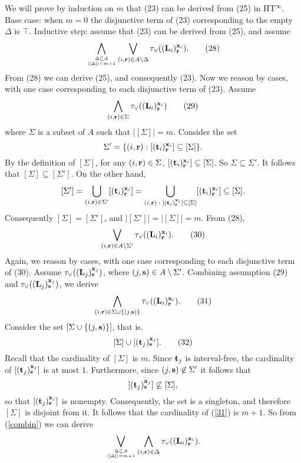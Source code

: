 \documentclass{tlp}
\def\beq{\begin{equation}}
\def\eeq#1{\label{#1}\end{equation}}
\begin{document}
\begin{proof*}
We will prove by induction on $m$ that
(23) can be derived from (25) in HT\/$^\infty$.
Base case: when $m = 0$ the disjunctive term of (23)
corresponding to the empty $\Delta$ is $\top$.
Inductive step: assume that (23) can be derived from
(25), and assume
\[
  \bigwedge_{\Delta \subseteq A \atop \lvert [\Delta]\rvert < m + 1}
  \bigvee_{(i,{\bf r}) \in A\setminus\Delta}
  \tau_{\lor}(({\bf L}_i)^{{\bf x}_i}_{\bf r}).
\tag{28}
\label{monok}
\]
From (28) we can derive (25), and consequently
(23).
Now we reason by cases, with one case corresponding to each disjunctive
term of (23).
Assume
\[
  \bigwedge_{(i,{\bf r}) \in \Sigma}
  \tau_{\lor}(({\bf L}_i)^{{\bf x}_i}_{\bf r})
\tag{29}
\label{dterm2}
\]
where $\Sigma$ is a subset of $A$ such that $\lvert [\Sigma]\rvert = m$.
Consider the set
$$\Sigma' = \{(i, {\bf r}) : [({\bf t}_i)^{{\bf x}_i}_{\bf r}]
\subseteq [\Sigma]\}.$$
By the definition of $[\Sigma]$, for any $(i, {\bf r}) \in \Sigma$,
$[({\bf t}_i)^{{\bf x}_i}_{\bf r}] \subseteq [\Sigma]$. So $\Sigma \subseteq
\Sigma'$. It follows that $[\Sigma] \subseteq [\Sigma']$.
On the other hand,
$$[\Sigma'] =
\bigcup_{(i, {\bf r}) \in \Sigma'} [({\bf t}_i)^{{\bf x}_i}_{\bf r}] =
\bigcup_{(i, {\bf r})\;:\;
[({\bf t}_i)^{{\bf x}_i}_{\bf r}] \subseteq [\Sigma]}
[({\bf t}_i)^{{\bf x}_i}_{{\bf r}}] \subseteq [\Sigma].$$
Consequently $[\Sigma] = [\Sigma']$, and
$\lvert [\Sigma'] \rvert = \lvert [\Sigma] \rvert = m.$
From (28),
\[
  \bigvee_{(i,{\bf r}) \in A\setminus\Sigma'}
  \tau_{\lor}(({\bf L}_i)^{{\bf x}_i}_{\bf r}).
\tag{30}
\label{monok_res}
\]
Again, we reason by cases, with one case corresponding to each disjunctive
term of (30). Assume $\tau_{\lor}(({\bf L}_j)^
{{\bf x}_j}_{\bf s})$, where $(j, {\bf s}) \in A \setminus \Sigma'$.
Combining assumption (29) and $\tau_{\lor}(({\bf L}_j)^
{{\bf x}_j}_{\bf s})$, we derive
\[
  \bigwedge_{(i, {\bf r}) \in \Sigma \cup \{(j,{\bf s})\}}
  \tau_{\lor}(({\bf L}_i)^{{\bf x}_i}_{\bf r}).
\tag{31}
\label{combin}
\]
Consider the set $[\Sigma \cup \{(j, {\bf s})\}]$, that is,
\[
[\Sigma] \cup [({\bf t}_j)^{{\bf x}_j}_{\bf s}].
\tag{32}
\label{31}
\]
Recall that the cardinality
of $[\Sigma]$ is $m$. Since ${\bf t}_j$ is interval-free,
the cardinality of $[({\bf t}_j)^{{\bf x}_j}_{\bf s}]$ is at most $1$.
Furthermore,
since $(j, {\bf s}) \not \in \Sigma'$ it follows that
$$[({\bf t}_j)^{{\bf x}_j}_{\bf s}] \not \subseteq [\Sigma],$$
so that $[({\bf t}_j)^{{\bf x}_j}_{\bf s}]$ is nonempty.
Consequently,
the set is a singleton,
and therefore $[\Sigma]$ is disjoint from it.
It follows that the cardinality of (\ref{31}) is $m+1$.
So from (\ref{combin}) we can derive
$$
  \bigvee_{\Delta\subseteq A \atop \lvert [\Delta] \rvert = m+1}
  \bigwedge_{(i,{\bf r}) \in \Delta}
  \tau_{\lor}(({\bf L}_i)^{{\bf x}_i}_{\bf r}).
$$
\end{proof*}
\end{document}
